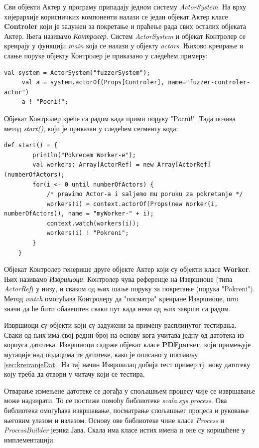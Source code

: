 \documentclass[12pt,oneside]{memoir}
\begin{document}
Сви објекти Актер у програму припадају једном систему \textit{ActorSystem}. На врху хијерархије корисничких компоненти налази се један објекат Актер класе \textbf{Controler} који је задужен за покретање и праћење рада свих осталих објеката Актер. Њега називамо \textit{Контролер}. Систем \textit{ActorSystem} и објекат Контролер се креирају у функцији \textit{main} која се налази у објекту \textit{actors}. Њихово креирање и слање поруке објекту Контролер је приказано у следећем примеру:

\begin{lstlisting}[frame=single]
     val system = ActorSystem("fuzzerSystem");
     val a = system.actorOf(Props[Controler], name="fuzzer-controler-actor")
     a ! "Pocni!";
\end{lstlisting}

Објекат Контролер креће са радом када прими поруку "Pocni!". Тада позива метод \textit{start()}, који је приказан у следећем сегменту кода:

\begin{lstlisting}[frame=single]
    def start() = {
        println("Pokrecem Worker-e");
        val workers: Array[ActorRef] = new Array[ActorRef](numberOfActors);
        for(i <- 0 until numberOfActors) {
            /* pravimo Actor-a i saljemo mu poruku za pokretanje */
            workers(i) = context.actorOf(Props(new Worker(i, numberOfActors)), name = "myWorker-" + i);
            context.watch(workers(i));
            workers(i) ! "Pokreni";
        }
    }
\end{lstlisting}

Објекат Контролер генерише друге објекте Актер који су објекти класе \textbf{Worker}. Њих називамо \textit{Извршиоци}. Контролер чува референце на Извршиоце (типа \textit{ActorRef}) у низу, и сваком од њих шаље поруку за покретање (порука "Pokreni"). Метод \textit{watch} омогућава Контролеру да "посматра" креиране Извршиоце, што значи да ће бити обавештен сваки пут када неки од њих заврши са радом.

Извршиоци су објекти који су задужени за примену расплинутог тестирања. Сваки од њих има свој редни број на основу кога учитава једну од датотека из корпуса датотека. Извршиоци садрже објекат класе \textbf{PDFparser}, који примењује мутације над подацима те датотеке, како је описано у поглављу \ref{sec:kreiranjeDat}. На тај начин Извршилац добија тест пример тј. нову датотеку коју треба да отвори у читачу који се тестира.
 
Отварање измењене датотеке се догађа у спољашњем процесу чије се извршавање може надзирати. То се постиже помоћу библиотеке \textit{scala.sys.process}. Ова библиотека омогућава извршавање, посматрање спољашњег процеса и руковање његовим улазом и излазом. Основу ове библиотеке чине класе \textit{Process} и \textit{ProcessBuilder} језика Јава. Скала има класе истих имена и оне су коришћене у имплементацији.
\end{document}
